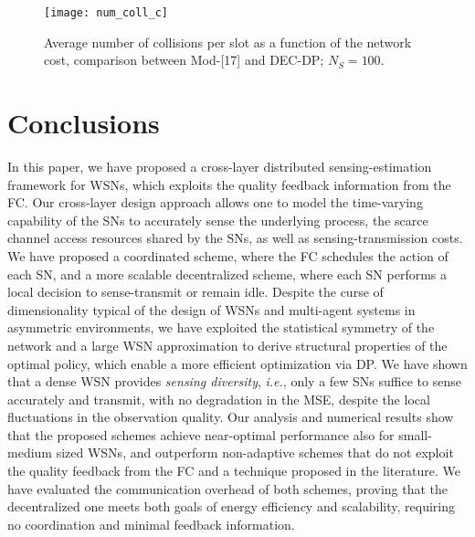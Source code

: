 \documentclass[10pt,twocolumn,twoside]{IEEEtran}
\theoremstyle{plain}
\begin{document}
\begin{figure}[t]
\centering
\texttt{[image: num\_coll\_c]}
\vspace{-3mm}
\caption{Average number of collisions per slot as a function of the network cost, comparison between Mod-[17] and DEC-DP;
 $N_S=100$.}\label{num_coll}
\vspace{-5mm}
\end{figure}
 \vspace{-3mm}
\section{Conclusions}\label{conclusions}
 In this paper, we have proposed a cross-layer distributed sensing-estimation framework for WSNs,
 which exploits the quality feedback information from the FC.
 Our cross-layer design approach allows one to model the time-varying capability 
 of the SNs to accurately sense the underlying process,
  the scarce channel access resources shared by the SNs, as well as sensing-transmission costs.
We have proposed a coordinated scheme, where the FC schedules the action of each SN,
 and a more scalable decentralized scheme, where each SN performs a local decision to sense-transmit or remain idle.
 Despite the curse of dimensionality typical of the design of WSNs and multi-agent systems in asymmetric environments,
 we have
 exploited the statistical symmetry of the network and a large WSN approximation to derive structural properties of the optimal policy,
which enable a more efficient optimization via DP.
We have shown that a dense WSN provides \emph{sensing diversity}, \emph{i.e.},
only a few SNs suffice to sense accurately and transmit, with no degradation in the MSE,
 despite the local fluctuations in the observation quality.
Our analysis and numerical results show that the proposed schemes achieve near-optimal performance
also for small-medium sized WSNs, and outperform non-adaptive schemes that do not exploit the quality feedback from the FC
and a technique proposed in the literature. 
We have evaluated the communication overhead of both schemes,
proving that the decentralized one
 meets both goals of energy efficiency and scalability, requiring no coordination and minimal feedback information.

 
\appendices
\vspace{-3mm}
\end{document}
